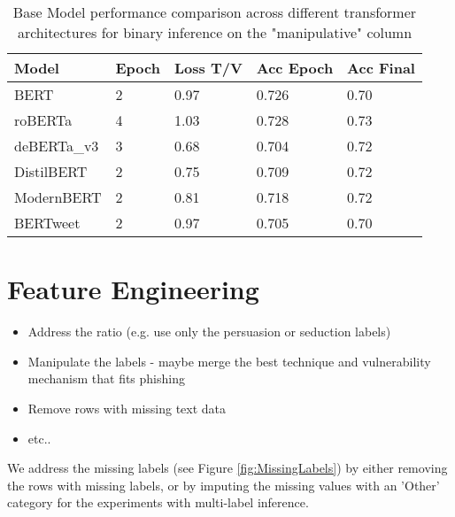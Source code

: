 \documentclass[
	letterpaper, %
	12pt, %
	unnumberedsections, %
	twoside, %
]{LTJournalArticle}
\begin{document}
\begin{table}[h!]
	\small
	\begin{tabular}{|p{2.1cm}|p{1cm}|p{1cm}|p{1cm}|p{1cm}|}
		\hline
		\textbf{Model} & \textbf{Epoch} & \textbf{Loss T/V} & \textbf{Acc Epoch} & \textbf{Acc Final} \\
		\hline
		BERT           & 2              & 0.97              & 0.726              & 0.70               \\
		roBERTa        & 4              & 1.03              & 0.728              & 0.73               \\
		deBERTa\_v3    & 3              & 0.68              & 0.704              & 0.72               \\
		DistilBERT     & 2              & 0.75              & 0.709              & 0.72               \\
		ModernBERT     & 2              & 0.81              & 0.718              & 0.72               \\
		BERTweet       & 2              & 0.97              & 0.705              & 0.70               \\
		\hline
	\end{tabular}
	\caption{Base Model performance comparison across different transformer architectures for binary inference on the "manipulative" column}
	\label{tab:BaseModelPerformance}
\end{table}




\section{Feature Engineering}\label{sec:FeatureEngineering}


\begin{itemize}
	\item Address the ratio (e.g. use only the persuasion or seduction labels)
	\item Manipulate the labels - maybe merge the best technique and vulnerability mechanism that fits phishing
	\item Remove rows with missing text data
	\item etc..
\end{itemize}

We address the missing labels (see Figure \ref{fig:MissingLabels}) by either removing the rows with missing labels, or by imputing the missing values with an 'Other' category for the experiments with multi-label inference.
\end{document}
